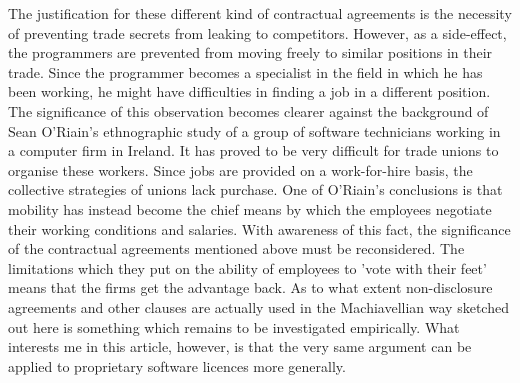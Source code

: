 The justif\hbox{}ication for these dif\hbox{}ferent kind of contractual agreements is the
necessity of preventing trade secrets from leaking to competitors. However, as a
side-ef\hbox{}fect, the programmers are prevented from moving freely to similar
positions in their trade. Since the programmer becomes a specialist in the
f\hbox{}ield in which he has been working, he might have dif\hbox{}f\hbox{}iculties in finding
a job in a dif\hbox{}ferent position. The signif\hbox{}icance of this observation becomes
clearer against the background of Sean O'Riain's ethnographic study of a group
of software technicians working in a computer f\hbox{}irm in Ireland. It has proved
to be very dif\hbox{}f\hbox{}icult for trade unions to organise these workers. Since jobs
are provided on a work-for-hire basis, the collective strategies of unions lack
purchase. One of O'Riain's conclusions is that mobility has instead become the
chief means by which the employees negotiate their working conditions and
salaries\cite{gnunited-oriain04}. With awareness of this fact, the
signif\hbox{}icance of the contractual agreements mentioned above must be
reconsidered. The limitations which they put on the ability of employees to
'vote with their feet' means that the f\hbox{}irms get the advantage back. As to what
extent non-disclosure agreements and other clauses are actually used in the
Machiavellian way sketched out here is something which remains to be
investigated empirically. What interests me in this article, however, is that
the very same argument can be applied to proprietary software licences more
generally. 

